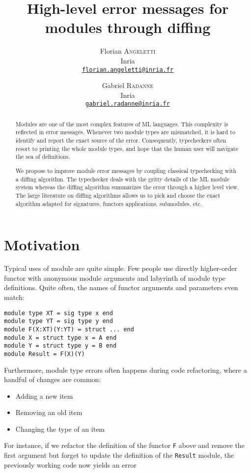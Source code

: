 \documentclass[a4paper,11pt]{scrartcl}
\title{High-level error messages for modules through diffing}
\author{
  Florian \textsc{Angeletti}\\
  Inria\\
  \href{mailto:florian.angeletti@inria.fr}
  {\nolinkurl{florian.angeletti@inria.fr}}
  \and
  Gabriel \textsc{Radanne}\\
  Inria\\
  \href{mailto:gabriel.radanne@inria.fr}
  {\nolinkurl{gabriel.radanne@inria.fr}}
}
\date{}
\begin{document}
\maketitle

\begin{abstract}
Modules are one of the most complex features of ML languages. This complexity is reflected in error messages.
Whenever two module types are mismatched, it is hard to identify and report the exact source of the error.
Consequently, typecheckers often resort to printing the whole module types, and hope that the human user will navigate the sea of definitions.

We propose to improve module error messages by coupling classical typechecking with
a diffing algorithm.
The typechecker deals with the gritty details of
the ML module system whereas the diffing algorithm summarizes the error through
a higher level view.
The large literature on diffing algorithms allows us to pick and choose
the exact algorithm adapted for signatures, functors applications, submodules, etc.
\end{abstract}

\section{Motivation}
Typical uses of module are quite simple. Few people use directly higher-order functor with anonymous module arguments and labyrinth of module type definitions. Quite often, the names of functor arguments and parameters even match:
\begin{verbatim}
module type XT = sig type x end
module type YT = sig type y end
module F(X:XT)(Y:YT) = struct ... end
module X = struct type x = A end
module Y = struct type y = B end
module Result = F(X)(Y)
\end{verbatim}

Furthermore, module type errors often happens during code refactoring, where a handful of changes are common:
\begin{itemize}
\item Adding a new item
\item Removing an old item
\item Changing the type of an item
\end{itemize}

For instance, if we refactor the definition of the functor \texttt{F} above and remove the first argument
but forget to update the definition of the \texttt{Result} module, the previously working code
now yields an error
\end{document}
